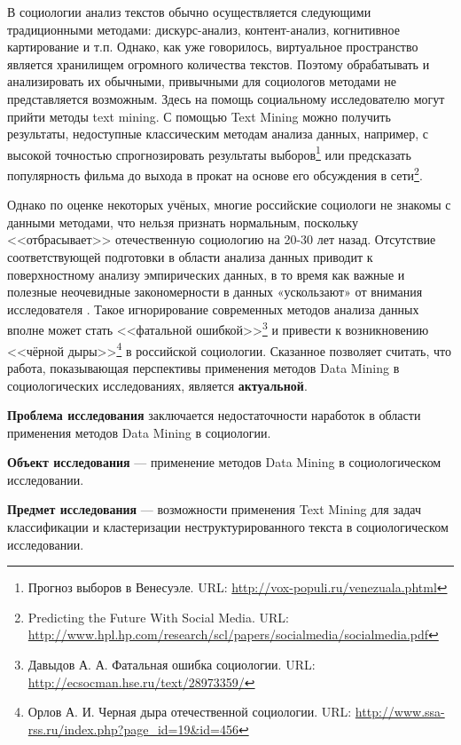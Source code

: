 В социологии анализ текстов обычно осуществляется следующими традиционными методами: дискурс-анализ,  контент-анализ, когнитивное картирование и т.п. Однако, как уже говорилось, виртуальное пространство является хранилищем огромного количества текстов. Поэтому обрабатывать и анализировать их обычными, привычными для социологов методами не  представляется возможным. Здесь на помощь социальному исследователю могут прийти методы text mining. С помощью Text Mining можно получить результаты, недоступные классическим методам анализа данных, например, с высокой точностью спрогнозировать результаты выборов\footnote{Прогноз выборов в Венесуэле. URL: \url{http://vox-populi.ru/venezuala.phtml}} или предсказать популярность фильма до выхода в прокат на основе его обсуждения в сети\footnote{Predicting the Future With Social Media. URL: \url{http://www.hpl.hp.com/research/scl/papers/socialmedia/socialmedia.pdf}}. 

Однако по оценке некоторых учёных, многие российские социологи не знакомы с данными методами, что нельзя признать нормальным, поскольку <<отбрасывает>> отечественную социологию на 20-30 лет назад. Отсутствие соответствующей подготовки в области анализа данных приводит к поверхностному анализу эмпирических данных, в то время как важные и полезные неочевидные закономерности в данных «ускользают» от внимания исследователя \cite{Davydov_Knowledge}. Такое игнорирование современных методов анализа данных вполне может стать <<фатальной ошибкой>>\footnote{Давыдов А. А. Фатальная ошибка социологии. URL: \url{http://ecsocman.hse.ru/text/28973359/}}  и привести к возникновению <<чёрной дыры>>\footnote{Орлов А. И. Черная дыра отечественной социологии. URL: \url{http://www.ssa-rss.ru/index.php?page_id=19&id=456}} в российской социологии. Сказанное позволяет считать, что работа, показывающая перспективы применения методов Data Mining в социологических исследованиях, является \textbf{актуальной}. 

\textbf{Проблема исследования} заключается недостаточности наработок в области применения методов Data Mining в социологии.

\textbf{Объект исследования} --- применение методов Data Mining в социологическом исследовании.

\textbf{Предмет исследования} --- возможности применения Text Mining для задач классификации и кластеризации неструктурированного текста в социологическом исследовании.
\clearpage
